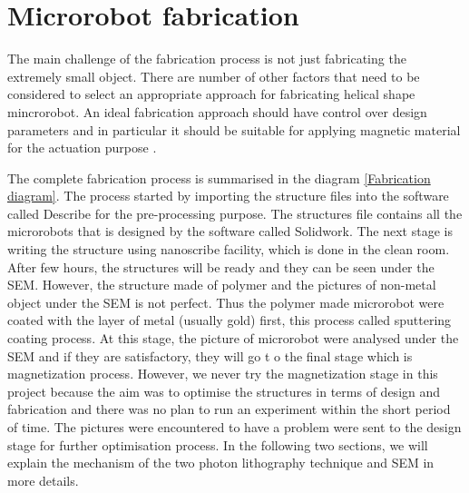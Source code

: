 \documentclass[12pt,a4paper,titlepage]{report}
\begin{document}
\section{Microrobot fabrication} \label{microFabric}

The main challenge of the fabrication process is not just fabricating the extremely small object. 
There are number of other factors that need to be considered to select an appropriate approach for 
fabricating helical shape mincrorobot. An ideal fabrication approach should have control over design 
parameters and in particular it should be suitable for applying magnetic material
 for the actuation purpose \citep{peyer2013bio}.

The complete fabrication process is summarised in the diagram \ref{Fabrication diagram}.
The process started by importing the structure files into the software called Describe for 
the pre-processing purpose. The structures file contains all the microrobots that is designed by the 
software called Solidwork. The next stage is writing the structure using nanoscribe facility, which is 
done in the clean room. After few hours, the structures will be ready and they can be seen under 
the \ac*{SEM}. However, the structure made of polymer and the pictures of non-metal object under 
the \ac*{SEM} is not perfect. Thus the polymer made microrobot were coated with the layer of 
metal (usually gold) first, this process called sputtering coating process.  At this stage, the 
picture of microrobot were analysed under the \ac*{SEM} and if they are satisfactory, they will go t
o the final stage which is magnetization process. However, we never try the magnetization stage 
in this project because the aim was to optimise the structures in terms of design and fabrication and 
there was no plan to run an experiment within the short period of time. The pictures were encountered 
to have a problem were sent to the design stage for further optimisation process. In the following 
two sections, we will explain the mechanism of the two photon lithography technique and \ac*{SEM} in
 more details.   




\end{document}
